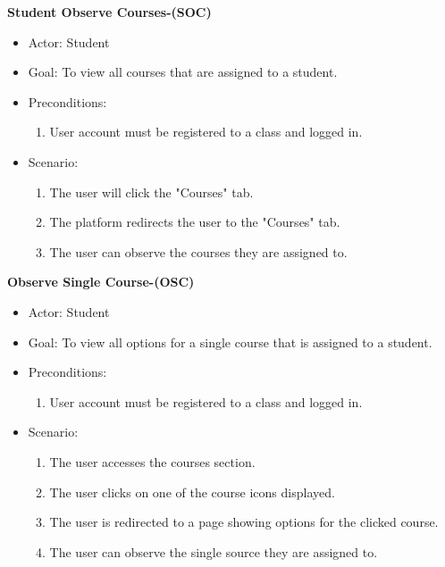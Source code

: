\documentclass[letterpaper,12pt,oneside,listof=totoc]{scrreprt}
\begin{document}
\hfill \break
\textbf{Student Observe Courses-(SOC)}
\begin{itemize}
    \item Actor: Student
    \item Goal: To view all courses that are assigned to a student.
    \item Preconditions:
    \begin{enumerate}
        \item User account must be registered to a class and logged in.
    \end{enumerate}
    \item Scenario:
    \begin{enumerate}
        \item The user will click the "Courses" tab.
        \item The platform redirects the user to the "Courses" tab.
        \item The user can observe the courses they are assigned to.
    \end{enumerate}
\end{itemize}

\hfill \break
\textbf{Observe Single Course-(OSC)}
\begin{itemize}
    \item Actor: Student
    \item Goal: To view all options for a single course that is assigned to a student.
    \item Preconditions:
    \begin{enumerate}
        \item User account must be registered to a class and logged in.
    \end{enumerate}
    \item Scenario:
    \begin{enumerate}
        \item The user accesses the courses section.
        \item The user clicks on one of the course icons displayed.
        \item The user is redirected to a page showing options for the clicked course.
        \item The user can observe the single source they are assigned to.
    \end{enumerate}
\end{itemize}
\end{document}
